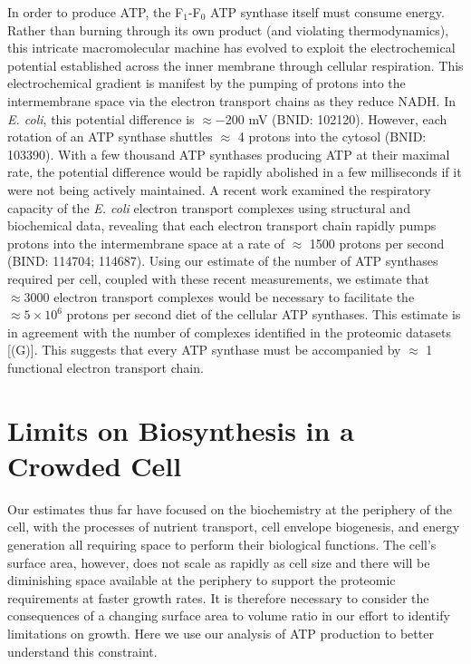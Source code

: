 In order to produce ATP, the F$_1$-F$_0$ ATP synthase itself must consume
energy. Rather than burning through its own product (and violating
thermodynamics), this intricate macromolecular machine has evolved to exploit
the electrochemical potential established across the inner membrane through
cellular respiration. This electrochemical gradient is manifest by the pumping
of protons into the intermembrane space via the electron transport chains as
they reduce NADH. In \textit{E. coli}, this potential difference is $\approx
-$200 mV (BNID: 102120). However, each rotation of an ATP synthase shuttles
$\approx$ 4 protons into the cytosol (BNID: 103390). With a few thousand ATP
synthases producing ATP at their maximal rate, the potential difference would be
rapidly abolished in a few milliseconds if it were not being actively
maintained. A recent work \citep{szenk2017} examined the respiratory capacity of
the \textit{E. coli} electron transport complexes using structural and
biochemical data, revealing that each electron transport chain rapidly pumps
protons into the intermembrane space at a rate of $\approx$ 1500 protons per
second (BIND: 114704; 114687). Using our estimate of the number of ATP synthases
required per cell, coupled with these recent measurements, we estimate that
$\approx 3000$ electron transport complexes would be necessary to facilitate the
$\approx 5 \times 10^6$ protons per second diet of the cellular ATP synthases.
This estimate is in agreement with the number of complexes identified in the
proteomic datasets [(G)]. This suggests
that every ATP synthase must be accompanied by $\approx$ 1 functional electron
transport chain.

\section{Limits on Biosynthesis in a Crowded Cell}
Our estimates thus far have focused on the biochemistry at the periphery of the
cell, with the processes of nutrient transport, cell envelope biogenesis, and
energy generation all requiring space to perform their biological functions. The
cell's surface area, however, does not scale as rapidly as cell size
\citep{harris2018} and there will be diminishing space available at the
periphery to support the proteomic requirements at faster growth rates. It is
therefore necessary to consider the consequences of a changing surface area to
volume ratio in our effort to identify limitations on growth. Here we use our
analysis of ATP production to better understand this constraint.

